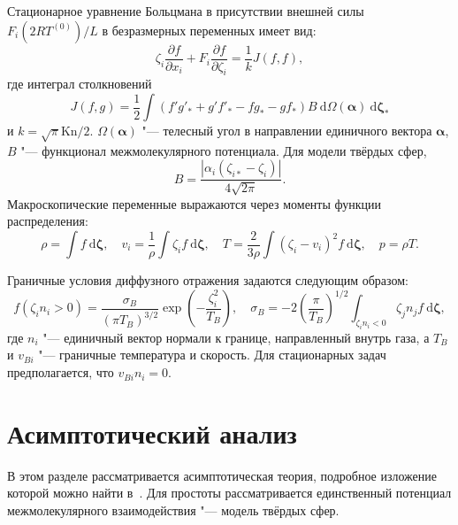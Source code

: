 \documentclass[
aps,%
12pt,%
final,%
notitlepage,%
oneside,%
onecolumn,%
nobibnotes,%
nofootinbib,%
superscriptaddress,%
noshowpacs,%
centertags]%
{revtex4}
\newcommand{\Kn}{\mathrm{Kn}}
\newcommand{\dd}{\:\mathrm{d}}
\newcommand{\pder}[2][]{\frac{\partial#1}{\partial#2}}
\newcommand{\dzeta}{\boldsymbol{\dd\zeta}}
\begin{document}
Стационарное уравнение Больцмана в присутствии внешней силы \(F_i (2RT^{(0)})/L\) в безразмерных переменных имеет вид:
\begin{equation}\label{eq:Boltzmann}
    \zeta_i\pder[f]{x_i} + F_i\pder[f]{\zeta_i} = \frac1k J(f,f),
\end{equation}
где интеграл столкновений
\begin{equation}\label{eq:integral}
    J(f,g) = \frac12 \int(f'g'_*+g'f'_*-fg_*-gf_*)B\dd\Omega(\boldsymbol\alpha) \dzeta_*
\end{equation}
и \(k = \sqrt\pi\Kn/2\).
\(\Omega(\boldsymbol{\alpha})\) "--- телесный угол в направлении единичного вектора \(\boldsymbol\alpha\),
\(B\) "--- функционал межмолекулярного потенциала. Для модели твёрдых сфер,
\begin{equation}\label{eq:ci_kernel}
    B = \frac{|\alpha_i(\zeta_{i*}-\zeta_i)|}{4\sqrt{2\pi}}.
\end{equation}
Макроскопические переменные выражаются через моменты функции распределения:
\begin{equation}\label{eq:macro}
    \rho = \int f \dzeta, \quad
    v_i = \frac1{\rho} \int \zeta_i f \dzeta, \quad
    T = \frac{2}{3\rho}\int(\zeta_i-v_i)^2 f \dzeta, \quad
    p = \rho T.
\end{equation}

Граничные условия диффузного отражения задаются следующим образом:
\begin{equation}\label{eq:diffuse_bc}
    f\left(\zeta_i n_i > 0\right) =
        \frac{\sigma_B}{(\pi T_B)^{3/2}} \exp\left(-\frac{\zeta_i^2}{T_B}\right), \quad
    \sigma_B = -2\left(\frac{\pi}{T_B}\right)^{1/2} \int_{\zeta_i n_i < 0} \zeta_j n_j f\dzeta,
\end{equation}
где \(n_i\) "--- единичный вектор нормали к границе, направленный внутрь газа,
а \(T_B\) и \(v_{Bi}\) "--- граничные температура и скорость.
Для стационарных задач предполагается, что \(v_{Bi}n_i = 0\).

\section{Асимптотический анализ}

В этом разделе рассматривается асимптотическая теория,
подробное изложение которой можно найти
в~\cite{Sone1996, Sone2002, Sone2007}.
Для простоты рассматривается единственный потенциал межмолекулярного взаимодействия "---
модель твёрдых сфер.
\end{document}
